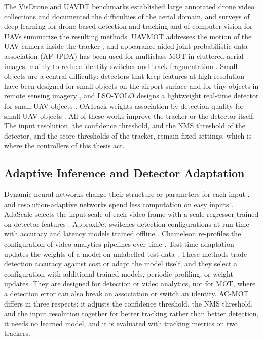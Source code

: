 The VisDrone \cite{zhu2022visdrone} and UAVDT \cite{du2018uavdt} benchmarks established large annotated drone video collections and documented the difficulties of the aerial domain, and surveys of deep learning for drone-based detection and tracking \cite{wu2022uavsurvey} and of computer vision for UAVs \cite{kanellakis2017uavvision} summarize the resulting methods. UAVMOT addresses the motion of the UAV camera inside the tracker \cite{liu2022uavmot}, and appearance-aided joint probabilistic data association (AF-JPDA) has been used for multiclass MOT in cluttered aerial images, mainly to reduce identity switches and track fragmentation \cite{kim2024afjpda}. Small objects are a central difficulty: detectors that keep features at high resolution have been designed for small objects on the airport surface \cite{huang2022airportsmall} and for tiny objects in remote sensing imagery \cite{fathy2026toren}, and LSO-YOLO designs a lightweight real-time detector for small UAV objects \cite{dai2026lsoyolo}. OATrack weights association by detection quality for small UAV objects \cite{qi2026oatrack}. All of these works improve the tracker or the detector itself. The input resolution, the confidence threshold, and the NMS threshold of the detector, and the score thresholds of the tracker, remain fixed settings, which is where the controllers of this thesis act.

\subsection{Adaptive Inference and Detector Adaptation}\label{sec:rw-inference}
Dynamic neural networks change their structure or parameters for each input \cite{han2022dynamic}, and resolution-adaptive networks spend less computation on easy inputs \cite{yang2020ranet}. AdaScale selects the input scale of each video frame with a scale regressor trained on detector features \cite{chin2019adascale}. ApproxDet switches detection configurations at run time with accuracy and latency models trained offline \cite{xu2020approxdet}. Chameleon re-profiles the configuration of video analytics pipelines over time \cite{jiang2018chameleon}. Test-time adaptation updates the weights of a model on unlabelled test data \cite{wang2021tent}. These methods trade detection accuracy against cost or adapt the model itself, and they select a configuration with additional trained models, periodic profiling, or weight updates. They are designed for detection or video analytics, not for MOT, where a detection error can also break an association or switch an identity. AC-MOT differs in three respects: it adjusts the confidence threshold, the NMS threshold, and the input resolution together for better tracking rather than better detection, it needs no learned model, and it is evaluated with tracking metrics on two trackers.

